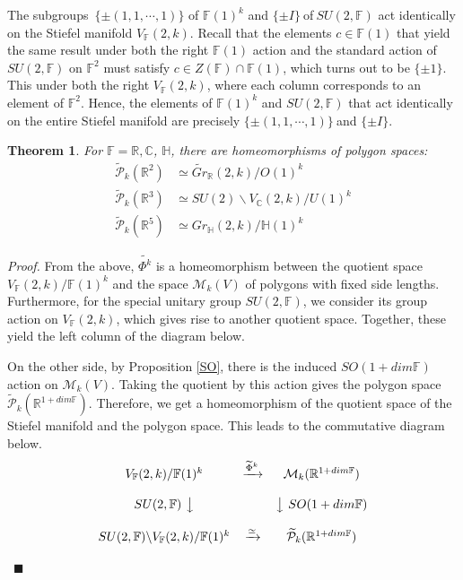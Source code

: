 \documentclass[a4paper]{article}%
\newtheorem{theorem}{Theorem}
\newenvironment{proof}[1][Proof]{\noindent\textit{#1.} }{}
\begin{document}
The subgroups\ $\{\pm\left(  1,1,\cdots,1\right)  \}$ of $\mathbb{F}(1)^{k}$
and $\{\pm I\}\ $of$\ SU(2,\mathbb{F})$ act identically on the Stiefel
manifold $V_{\mathbb{F}}(2,k)$. Recall that the elements $c\in\mathbb{F}(1)$
that yield the same result under both the right $\mathbb{F}(1)$ action and the
standard action of $SU(2,\mathbb{F})$ on $\mathbb{F}^{2}$ must satisfy $c\in
Z(\mathbb{F})\cap\mathbb{F}(1)$, which turns out to be $\{\pm1\}$. This under
both the right $V_{\mathbb{F}}(2,k)$, where each column corresponds to an
element of $\mathbb{F}^{2}$. Hence, the elements of $\mathbb{F}(1)^{k}$ and
$SU(2,\mathbb{F})$ that act identically on the entire Stiefel manifold are
precisely $\{\pm\left(  1,1,\cdots,1\right)  \}\ $and $\{\pm I\}$.

\begin{theorem}
\label{thm1} For $\mathbb{F}=\mathbb{R},\mathbb{C}$, $\mathbb{H}$, there are
homeomorphisms of polygon spaces:%
\begin{align*}
\widetilde{\mathcal{P}}_{k}(\mathbb{R}^{2})  &  \simeq\widetilde
{Gr}_{\mathbb{R}}(2,k)/O(1)^{k}\\
\widetilde{\mathcal{P}}_{k}(\mathbb{R}^{3})  &  \simeq SU(2)\backslash
V_{\mathbb{C}}(2,k)/U(1)^{k}\\
\widetilde{\mathcal{P}}_{k}(\mathbb{R}^{5})  &  \simeq Gr_{\mathbb{H}%
}(2,k)/\mathbb{H}(1)^{k}%
\end{align*}

\end{theorem}

\begin{proof}
From the above, $\widetilde{\Phi^{k}}$ is a homeomorphism between the quotient
space $V_{\mathbb{F}}(2,k)/\mathbb{F}(1)^{k}$ and the space $\mathcal{M}%
_{k}(V)$ of polygons with fixed side lengths. Furthermore, for the special
unitary group $SU(2,\mathbb{F})$, we consider its group action on
$V_{\mathbb{F}}(2,k)$, which gives rise to another quotient space. Together,
these yield the left column of the diagram below.

On the other side, by Proposition \ref{SO}, there is the induced
$SO(1+dim\mathbb{F})$ action on $\mathcal{M}_{k}(V)$. Taking the quotient by
this action gives the polygon space $\widetilde{\mathcal{P}}_{k}%
(\mathbb{R}^{1+dim\mathbb{F}})$. Therefore, we get a homeomorphism of the
quotient space of the Stiefel manifold and the polygon space. This leads to
the commutative diagram below.%
\[%
\begin{matrix}
V_{\mathbb{F}}(2,k)/\mathbb{F}(1)^{k} & \xrightarrow{ \widetilde{\Phi}^k} &
\mathcal{M}_{k}(\mathbb{R}^{1+dim\mathbb{F}})\\
&  & \\
SU(2,\mathbb{F})\ \big\downarrow &  & \big\downarrow\ SO(1+dim\mathbb{F})\\
&  & \\
SU(2,\mathbb{F})\backslash V_{\mathbb{F}}(2,k)/\mathbb{F}(1)^{k} &
\xrightarrow{\simeq} & \widetilde{\mathcal{P}}_{k}(\mathbb{R}^{1+dim\mathbb{F}%
})
\end{matrix}
\]


\ $\blacksquare$
\end{proof}
\end{document}

